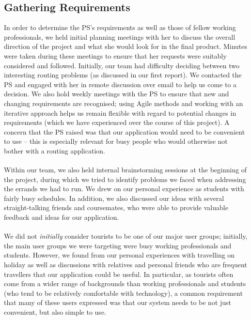 \documentclass[a4paper, 10pt]{article}
\begin{document}
\subsection{Gathering Requirements}
In order to determine the PS's requirements as well as those of fellow working professionals, we held initial planning meetings with her to discuss the overall direction of the project and what she would look for in the final product. Minutes were taken during these meetings to ensure that her requests were suitably considered and followed. Initially, our team had difficulty deciding between two interesting routing problems (as discussed in our first report). We contacted the PS and engaged with her in remote discussion over email to help us come to a decision. We also hold weekly meetings with the PS to ensure that new and changing requirements are recognised; using Agile methods and working with an iterative approach helps us remain flexible with regard to potential changes in requirements (which we have experienced over the course of this project). A concern that the PS raised was that our application would need to be convenient to use -- this is especially relevant for busy people who would otherwise not bother with a routing application.  \\\\
Within our team, we also held internal brainstorming sessions at the beginning of the project, during which we tried to identify problems we faced when addressing the errands we had to run. We drew on our personal experience as students with fairly busy schedules. In addition, we also discussed our ideas with several straight-talking friends and coursemates, who were able to provide valuable feedback and ideas for our application. \\\\
We did not \textit{initially} consider tourists to be one of our major user groups; initially, the main user groups we were targeting were busy working professionals and students. However, we found from our personal experiences with travelling on holiday as well as discussions with relatives and personal friends who are frequent travellers that our application could be useful. In particular, as tourists often come from a wider range of backgrounds than working professionals and students (who tend to be relatively comfortable with technology), a common requirement that many of these users expressed was that our system needs to be not just convenient, but also simple to use. \\\\
\end{document}
